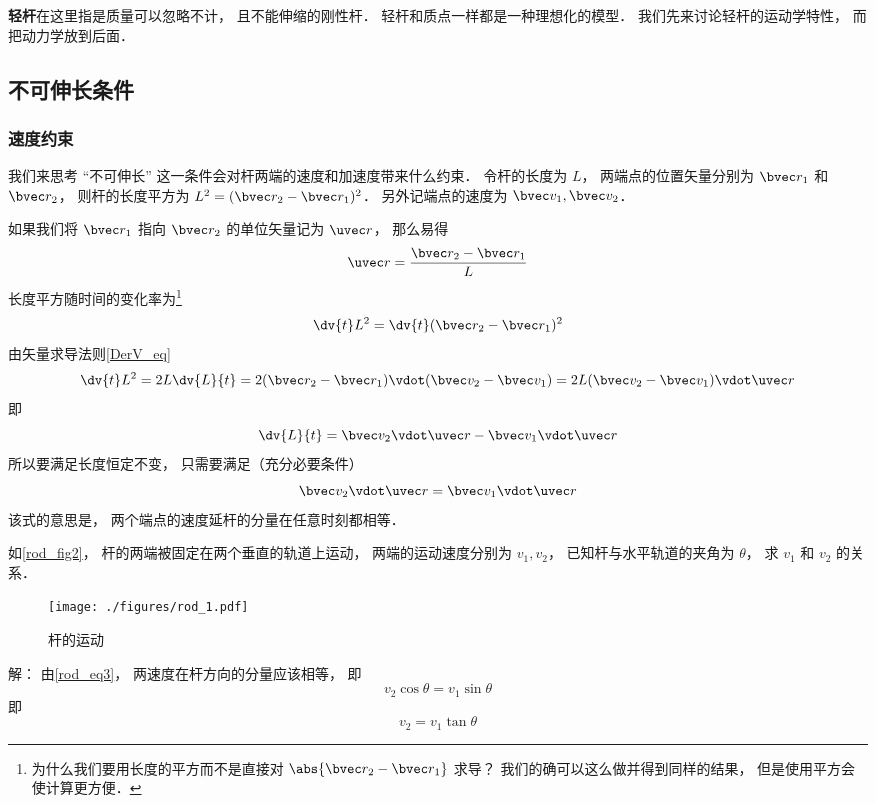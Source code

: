 

\textbf{轻杆}在这里指是质量可以忽略不计， 且不能伸缩的刚性杆． 轻杆和质点一样都是一种理想化的模型． 我们先来讨论轻杆的运动学特性， 而把动力学放到后面．

\subsection{不可伸长条件}
\subsubsection{速度约束}
我们来思考 “不可伸长” 这一条件会对杆两端的速度和加速度带来什么约束． 令杆的长度为 $L$， 两端点的位置矢量分别为 $\bvec r_1$ 和 $\bvec r_2$， 则杆的长度平方为 $L^2 = (\bvec r_2 - \bvec r_1)^2$． 另外记端点的速度为 $\bvec v_1, \bvec v_2$．

如果我们将 $\bvec r_1$ 指向 $\bvec r_2$ 的单位矢量记为 $\uvec r$， 那么易得
\begin{equation}\label{rod_eq7}
\uvec r = \frac{\bvec r_2 - \bvec r_1}{L}
\end{equation}
长度平方随时间的变化率为\footnote{为什么我们要用长度的平方而不是直接对 $\abs{\bvec r_2 - \bvec r_1}$ 求导？ 我们的确可以这么做并得到同样的结果， 但是使用平方会使计算更方便．}
\begin{equation}\label{rod_eq2}
\dv{t} L^2 = \dv{t} (\bvec r_2 - \bvec r_1)^2
\end{equation}
由矢量求导法则\autoref{DerV_eq}
\begin{equation}\label{rod_eq1}
\dv{t} L^2 = 2L \dv{L}{t} = 2 (\bvec r_2 - \bvec r_1) \vdot (\bvec v_2 - \bvec v_1) = 2L (\bvec v_2 - \bvec v_1) \vdot \uvec r
\end{equation}
即
\begin{equation}\label{rod_eq6}
\dv{L}{t} = \bvec v_2 \vdot \uvec r - \bvec v_1 \vdot \uvec r
\end{equation}
所以要满足长度恒定不变， 只需要满足（充分必要条件）
\begin{equation}\label{rod_eq3}
\bvec v_2 \vdot \uvec r = \bvec v_1 \vdot \uvec r
\end{equation}
该式的意思是， 两个端点的速度延杆的分量在任意时刻都相等．

\begin{example}{}\label{rod_ex1}
如\autoref{rod_fig2}， 杆的两端被固定在两个垂直的轨道上运动， 两端的运动速度分别为 $v_1, v_2$， 已知杆与水平轨道的夹角为 $\theta$， 求 $v_1$ 和 $v_2$ 的关系．
\begin{figure}[ht]
\centering
\texttt{[image: ./figures/rod\_1.pdf]}
\caption{杆的运动} \label{rod_fig1}
\end{figure}
解： 由\autoref{rod_eq3}， 两速度在杆方向的分量应该相等， 即
\begin{equation}
v_2 \cos\theta = v_1 \sin\theta
\end{equation}
即
\begin{equation}
v_2 = v_1 \tan\theta
\end{equation}
\end{example}

